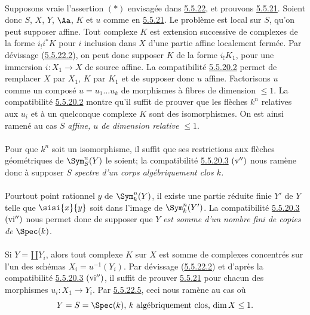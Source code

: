 \paragraph{}
Supposons vraie l'assertion $(\ast)$ envisagée dans \hyperref[XVII.lem5.5.22]{5.5.22}, et
prouvons \hyperref[XVII.thm5.5.21]{5.5.21}. Soient donc $S$, $X$, $Y$, $\Aa$, $K$ et $u$
comme en \hyperref[XVII.thm5.5.21]{5.5.21}. Le problème est local sur $S$, qu'on peut supposer
affine. Tout complexe $K$ est extension successive de complexes de la
forme $i_{!}i^{\ast}K$ pour $i$ inclusion dans $X$ d'une partie affine
localement fermée. Par dévissage (\hyperref[XVII.lem5.5.22.2]{5.5.22.2}), on peut donc supposer $K$
de la forme $i_{!}K_{1}$, pour une immersion $i:X_{1}\rightarrow X$ de
source affine. La compatibilité \hyperref[XVII.par5.5.20.2]{5.5.20.2} permet de remplacer $X$ par
$X_{1}$, $K$ par $K_{1}$ et de supposer donc $u$ affine. Factorisons
$u$ comme un composé $u=u_{1}\ldots u_{k}$ de morphismes à fibres de
dimension $\leq 1$. La compatibilité \hyperref[XVII.par5.5.20.2]{5.5.20.2} montre qu'il suffit de
prouver que les flèches $k^{n}$ relatives aux $u_{i}$ et à un
quelconque complexe $K$ sont des isomorphismes. On est ainsi ramené au
cas $S$ \emph{affine, $u$ de dimension relative $\leq 1$}.

\paragraph{}
Pour que $k^{n}$ soit un isomorphisme, il suffit que ses restrictions
aux flèches géométriques de $\Sym^{n}_{S}(Y)$ le soient; la
compatibilité \hyperref[XVII.par5.5.20.3]{5.5.20.3} ${\rm(v'')}$ nous ramène donc à supposer $S$
\emph{spectre d'un corps algébriquement clos $k$.}

\paragraph{}
Pour\pageoriginale tout point rationnel $y$ de $\Sym^{n}_{k}(Y)$, il
existe une partie réduite finie $Y'$ de $Y$ telle que $\sisi{x}{y}$ soit dans
l'image de $\Sym^{n}_{k}(Y')$. La compatibilité \hyperref[XVII.par5.5.20.3]{5.5.20.3} ${\rm(vi'')}$
nous permet donc de supposer que $Y$ \emph{est somme d'un nombre fini
de copies de} $\Spec(k)$.

\paragraph{}
Si $Y=\amalg Y_{i}$, alors tout complexe $K$ sur $X$ est somme de
complexes concentrés sur l'un des schémas $X_{i}=u^{-1}(Y_{i})$. Par
dévissage (\hyperref[XVII.lem5.5.22.2]{5.5.22.2}) et d'après la compatibilité
\hyperref[XVII.par5.5.20.3]{5.5.20.3}
${\rm (vi'')}$, il suffit de prouver \hyperref[XVII.thm5.5.21]{5.5.21} pour chacun des morphismes
$u_{i}:X_{1}\rightarrow Y_{i}$. Par \hyperref[XVII.par5.5.22.5]{5.5.22.5}, ceci nous ramène au cas
où
$$
\text{\rm $Y=S=\Spec(k)$, $k$ algébriquement clos, $\dim X\leq 1$.}
$$


